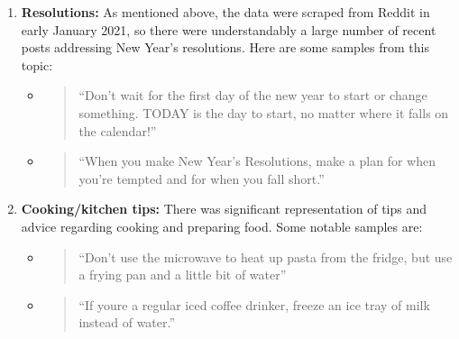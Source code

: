 \documentclass{amsart}
\theoremstyle{definition}
\theoremstyle{remark}
\newcommand{\tql}{\textquotedblleft}
\newcommand{\tqr}{\textquotedblright}
\begin{document}
\begin{enumerate}

\item \textbf{Resolutions:} As mentioned above, the data were scraped from Reddit in early January 2021, so there were understandably a large number of recent posts addressing New Year's resolutions.  Here are some samples from this topic:

\begin{itemize}

\item \begin{quote}
\tql Don’t wait for the first day of the new year to start or change something. TODAY is the day to start, no matter where it falls on the calendar!\tqr
\end{quote}

\item \begin{quote}
\tql When you make New Year's Resolutions, make a plan for when you're tempted and for when you fall short.\tqr
\end{quote}

\end{itemize}

\item \textbf{Cooking/kitchen tips:} There was significant representation of tips and advice regarding cooking and preparing food.  Some notable samples are:

\begin{itemize}

\item \begin{quote}
\tql Don't use the microwave to heat up pasta from the fridge, but use a frying pan and a little bit of water\tqr
\end{quote}
%

\item \begin{quote}
\tql If youre a regular iced coffee drinker, freeze an ice tray of milk instead of water.\tqr
\end{quote}
%


\end{itemize}
\end{enumerate}
\end{document}
